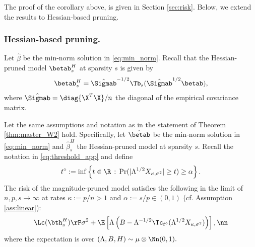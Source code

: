 The proof of the corollary above, is given in Section \ref{sec:risk}. Below, we extend the results to Hessian-based pruning.


\subsubsection{Hessian-based pruning.}
Let $\hat\beta$ be the min-norm solution in \eqref{eq:min_norm}. Recall that the Hessian-pruned model $\betab_s^H$ at sparsity $s$ is given by
\begin{align}\label{eq:hp}
\betab_s^H = \hat\Sigmab^{-1/2}\Tb_s(\hat\Sigmab^{1/2}\betab),
\end{align}
where $\hat\Sigmab=\diag{\X^T\X}/n$ the diagonal of the empirical covariance matrix. 

\begin{corollary}\label{cor:hes}
Let the same assumptions and notation as in the statement of Theorem \ref{thm:master_W2} hold. Specifically, let $\hat\betab$ be the min-norm solution in \eqref{eq:min_norm} and $\hat\beta_s^H$ the Hessian-pruned model at sparsity $s$. Recall the notation in \eqref{eq:threshold_app} and define
\begin{align}\label{eq:tdiam_app}
t^\diamond:=\inf\left\{t\in\R\,:\, \Pr(|\Lambda^{1/2}X_{\kappa,\sigma^2}|\geq t) \geq \alpha \right\}.
\end{align}
The risk of the magnitude-pruned model satisfies the following in the limit of $n,p,s\rightarrow\infty$ at rates $\kappa:=p/n>1$ and $\alpha:=s/p\in(0,1)$ (cf. Assumption \ref{ass:linear}):
\begin{align}
\Lc(\bth^H_s) \rP \sigma^2 + \E\left[ \Lambda\left(B-\Lambda^{-1/2}\Tc_{t^\diamond}(\Lambda^{1/2}X_{\kappa,\sigma^2})\right) \right],\nn
\end{align}
where the expectation is over $(\Lambda,B,H)\sim\mu\otimes\Nn(0,1).$
\end{corollary}
